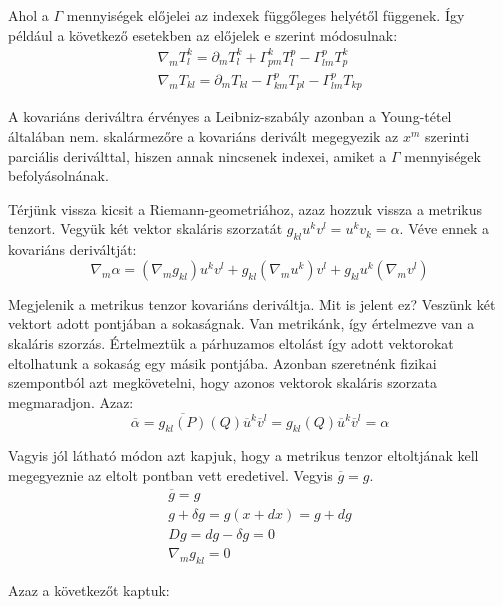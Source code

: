 \documentclass[a4paper,12pt]{article}
\begin{document}
\par Ahol a $\Gamma$ mennyiségek előjelei az indexek függőleges helyétől függenek. Így például a következő esetekben az előjelek e szerint módosulnak:
\begin{gather*}
    \nabla_{m}T^{k}_{l} = \partial_{m}T^{k}_{l} + \Gamma_{pm}^{k}T^{p}_{l} - \Gamma_{lm}^{p}T^{k}_{p} \\
    \nabla_{m}T_{kl} = \partial_{m}T_{kl} - \Gamma_{km}^{p}T_{pl} - \Gamma_{lm}^{p}T_{kp}
\end{gather*}
\par A kovariáns deriváltra érvényes a Leibniz-szabály azonban a Young-tétel általában nem. skalármezőre a kovariáns derivált megegyezik az $x^{m}$ szerinti parciális deriválttal, hiszen annak nincsenek indexei, amiket a $\Gamma$ mennyiségek befolyásolnának. 
\par Térjünk vissza kicsit a Riemann-geometriához, azaz hozzuk vissza a metrikus tenzort. Vegyük két vektor skaláris szorzatát $g_{kl}u^{k}v^{l} = u^{k}v_{k} = \alpha$. Véve ennek a kovariáns deriváltját:
\begin{equation*}
    \nabla_{m}\alpha = (\nabla_{m}g_{kl})u^{k}v^{l} + g_{kl}(\nabla_{m}u^{k})v^{l} + g_{kl}u^{k}(\nabla_{m}v^{l}) 
\end{equation*}
\par Megjelenik a metrikus tenzor kovariáns deriváltja. Mit is jelent ez? Veszünk két vektort adott pontjában a sokaságnak. Van metrikánk, így értelmezve van a skaláris szorzás. Értelmeztük a párhuzamos eltolást így adott vektorokat eltolhatunk a sokaság egy másik pontjába. Azonban szeretnénk fizikai szempontból azt megkövetelni, hogy azonos vektorok skaláris szorzata megmaradjon. Azaz:
\begin{equation*}
    \overline{\alpha} = \overline{g_{kl}(P)}(Q)\overline{u}^{k}\overline{v}^{l} = g_{kl}(Q)\overline{u}^{k}\overline{v}^{l} = \alpha
\end{equation*}
\par Vagyis jól látható módon azt kapjuk, hogy a metrikus tenzor eltoltjának kell megegyeznie az eltolt pontban vett eredetivel. Vegyis $\overline{g} = g$.
\begin{align*}
    \overline{g} = g \\
    g + \delta g = g(x+dx) = g + dg \\
    Dg = dg - \delta g = 0 \\
    \nabla_{m}g_{kl} = 0
\end{align*}
\par Azaz a következőt kaptuk:
\end{document}
